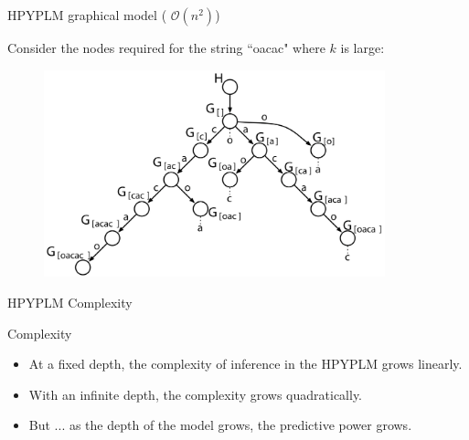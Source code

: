 \documentclass{beamer}
\begin{document}
%

\begin{frame}[t]{HPYPLM graphical model ( $\mathcal{O}(n^2)$)}
	
	Consider the nodes required for the string ``oacac" where $k$ is large: 
	\begin{figure}[t]
		\begin{center}
			\includegraphics[height = 6cm]{../figs/prefix_trie_not_coloured.pdf}
		\end{center}
	\end{figure}
\end{frame}

\begin{frame}[t]{HPYPLM Complexity}
	\begin{block}{Complexity}
		\begin{itemize}
			\item At a fixed depth, the complexity of inference in the HPYPLM grows linearly.  
			\item With an infinite depth, the complexity grows quadratically.
			\item But ... as the depth of the model grows, the predictive power grows.
		\end{itemize}
	\end{block}
\end{frame}
\end{document}
